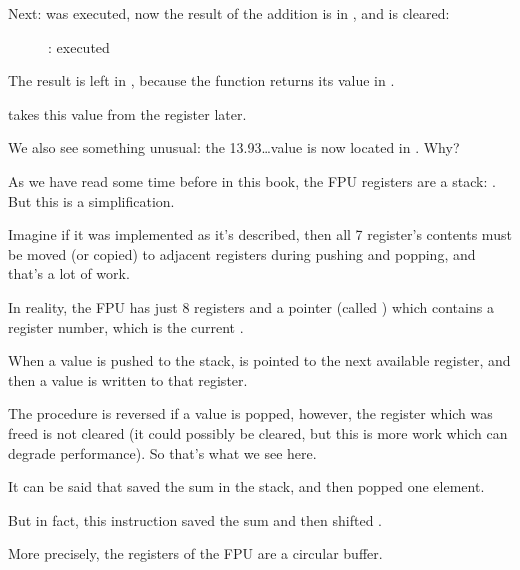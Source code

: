 \clearpage
Next: \FADDP was executed, now the result of the addition is in , and  is cleared:

\begin{figure}[H]
\centering
{}
\caption{\olly: \FADDP executed}
\label{fig:FPU_simple_olly_5}
\end{figure}

The result is left in , because the function returns its value in .

\main takes this value from the register later.

We also see something unusual: the 13.93\ldots value is now located in .
Why?

\label{FPU_is_rather_circular_buffer}

As we have read some time before in this book, the \ac{FPU} registers are a stack: . 
But this is a simplification.

Imagine if it was implemented  as it's described, then all 7 register's
contents must be moved (or copied) to adjacent registers during pushing and popping, 
and that's a lot of work.

In reality, the \ac{FPU} has just 8 registers and a pointer (called ) which contains a register number,
which is the current .

When a value is pushed to the stack,  is pointed to the next available register,
and then a value is written to that register.

The procedure is reversed if a value is popped, however, the register which was freed is not cleared
(it could possibly be cleared, but this is more work which can degrade performance).
So that's what we see here. 

It can be said that \FADDP saved the sum in the stack, and then popped one element.

But in fact, this instruction saved the sum and then shifted .

More precisely, the registers of the \ac{FPU} are a circular buffer.
